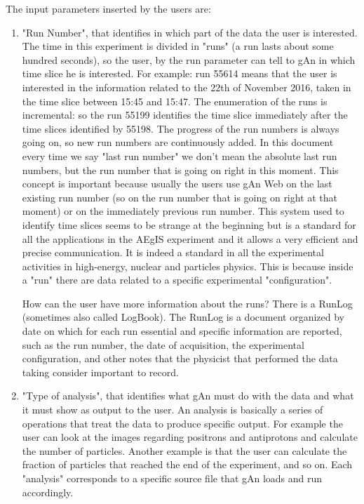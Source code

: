 The input parameters inserted by the users are:
\begin{enumerate}

\item "Run Number", that identifies in which part of the data the user is interested. 
The time in this experiment is divided in "runs" (a run lasts about some hundred seconds), so the user, by the run parameter can tell to gAn in which time slice he is interested. For example: run 55614 means that the user is interested in the information related to the 22th of November 2016, taken in the time slice between 15:45 and 15:47. 
The enumeration of the runs is incremental: so the run 55199 identifies the time slice immediately after the time slices identified by 55198. The progress of the run numbers is always going on, so new run numbers are continuously added. 
In this document every time we say "last run number" we don't mean the absolute last run numbers, but the run number that is going on right in this moment. This concept is important because usually the users use gAn Web on the last existing run number (so on the run number that is going on right at that moment) or on the immediately previous run number.  
This system used to identify time slices seems to be strange at the beginning but is a standard for all the applications in the AEgIS experiment and it allows a very efficient and precise communication. It is indeed a standard in all the experimental activities in high-energy, nuclear and particles physics. This is because inside a "run" there are data related to a specific experimental "configuration".

How can the user have more information about the runs? 
There is a RunLog (sometimes also called LogBook). The RunLog is a document organized by date on which for each run essential and specific information are reported, such as the run number, the date of acquisition, the experimental configuration, and other notes that the physicist that performed the data taking consider important to record.

\item "Type of analysis", that identifies what gAn must do with the data and what it must show as output to the user.
An analysis is basically a series of operations that treat the data to produce specific output. For example the user can look at the images regarding positrons and antiprotons and calculate the number of particles. Another example is that the user can calculate the fraction of particles that reached the end of the experiment, and so on. Each "analysis" corresponds to a specific source file that gAn loads and run accordingly.

\end{enumerate}


